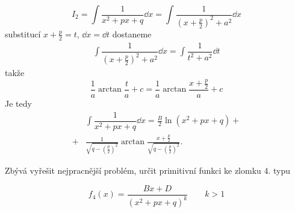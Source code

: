       \begin{equation}
        I_2 =\int\dfrac{1}{x^2+px+q}\dd{x} 
            =\int{\dfrac{1}{\left(x+\frac{p}{2}\right)^2 + a^2}}\dd{x}
      \end{equation}
      substitucí \(x + \frac{p}{2} = t\), \(\dd{x} = \dd{t}\) dostaneme 
      \begin{gather*}
        \int{\dfrac{1}{\left(x+\frac{p}{2}\right)^2 + a^2}}\dd{x} = 
        \int{\dfrac{1}{t^2+a^2}}\dd{t}
      \end{gather*}
      takže
      \begin{equation*}
        \dfrac{1}{a}\arctan\dfrac{t}{a} + c = \dfrac{1}{a}\arctan\dfrac{x + \frac{p}{2}}{a} + c 
      \end{equation*}
      Je tedy
      \begin{align}
          &\int\dfrac{1}{x^2+px+q}\dd{x} = \frac{B}{2}\ln(x^2+px+q) +              \nonumber     \\ 
        + &\frac{1}{\sqrt{q-\left(\frac{p}{2}\right)^2}}
                \arctan\frac{x+\frac{p}{2}}{\sqrt{q-\left(\frac{p}{2}\right)^2}}.  \label{mai:eq171}
      \end{align}
     
      

      Zbývá vyřešit nejpracnější problém, určit primitivní funkci ke zlomku 4. typu
      \begin{mdframed}[style=mdeq] 
        \begin{equation}\label{mai:eq172}
          f_4(x) = \frac{Bx + D}{(x^2+px+q)^k} \qquad k>1
        \end{equation}      
      \end{mdframed}
      
